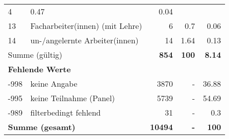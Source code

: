 \begin{longtable}{lXrrr}
       \num{4} &
       \num[round-mode=places,round-precision=2]{0,47} &
         \num[round-mode=places,round-precision=2]{0,04} \\

     13 &
     \multicolumn{1}{X}{ Facharbeiter(innen) (mit Lehre)   } &


       \num{6} &
       \num[round-mode=places,round-precision=2]{0,7} &
         \num[round-mode=places,round-precision=2]{0,06} \\

     14 &
     \multicolumn{1}{X}{ un-/angelernte Arbeiter(innen)   } &


       \num{14} &
       \num[round-mode=places,round-precision=2]{1,64} &
         \num[round-mode=places,round-precision=2]{0,13} \\
     \midrule
     \multicolumn{2}{l}{Summe (gültig)} &
       \textbf{\num{854}} &
     \textbf{100} &
       \textbf{\num[round-mode=places,round-precision=2]{8,14}} \\
     \multicolumn{5}{l}{\textbf{Fehlende Werte}}\\
       -998 &
       keine Angabe &
         \num{3870} &
        - &
         \num[round-mode=places,round-precision=2]{36,88} \\
       -995 &
       keine Teilnahme (Panel) &
         \num{5739} &
        - &
         \num[round-mode=places,round-precision=2]{54,69} \\
       -989 &
       filterbedingt fehlend &
         \num{31} &
        - &
         \num[round-mode=places,round-precision=2]{0,3} \\
     \midrule
     \multicolumn{2}{l}{\textbf{Summe (gesamt)}} &
          \textbf{\num{10494}} &
        \textbf{-} &
        \textbf{100} \\
     \bottomrule
     \end{longtable}
     
